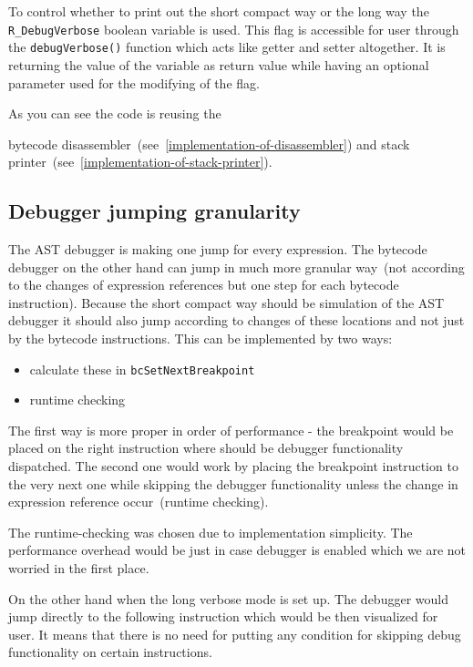 \documentclass[thesis=M,english]{FITthesis}[2018/10/20]
\newcommand{\code}[1]{\texttt{#1}}
\begin{document}
To control whether to print out the short compact way or the long way the \code{R{\_}DebugVerbose} boolean variable is used. This flag is accessible for user through the \code{debugVerbose()} function which acts like getter and setter altogether. It is returning the value of the variable as return value while having an optional parameter used for the modifying of the flag. 

As you can see the code is reusing the {bytecode disassembler~(see~\ref{implementation-of-disassembler}) and stack printer~(see~\ref{implementation-of-stack-printer}).

\subsection{Debugger jumping granularity}\label{debugger-jumping-granuality}

The AST debugger is making one jump for every expression. The bytecode debugger on the other hand can jump in much more granular way~(not according to the changes of expression references but one step for each bytecode instruction). Because the short compact way should be simulation of the AST debugger it should also jump according to changes of these locations and not just by the bytecode instructions. This can be implemented by two ways:

\begin{itemize}
	\item calculate these in \code{bcSetNextBreakpoint}
	\item runtime checking
\end{itemize}

The first way is more proper in order of performance - the breakpoint would be placed on the right instruction where should be debugger functionality dispatched. The second one would work by placing the breakpoint instruction to the very next one while skipping the debugger functionality unless the change in expression reference occur~(runtime checking). 

The runtime-checking was chosen due to implementation simplicity. The performance overhead would be just in case debugger is enabled which we are not worried in the first place.

On the other hand when the long verbose mode is set up. The debugger would jump directly to the following instruction which would be then visualized for user. It means that there is no need for putting any condition for skipping debug functionality on certain instructions.

}
\end{document}
